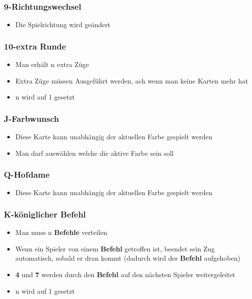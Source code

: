 \documentclass[10pt,a4paper]{article}
\providecommand{\tightlist}{%
  \setlength{\itemsep}{0pt}\setlength{\parskip}{0pt}}
\begin{document}
\subsubsection{9-Richtungswechsel}\label{richtungswechsel}

\begin{itemize}
\tightlist
\item
  Die Spielrichtung wird geändert
\end{itemize}

\subsubsection{10-extra Runde}\label{extra-runde}

\begin{itemize}
\item
  Man erhält n extra Züge
\item
  Extra Züge müssen Ausgeführt werden, ach wenn man keine Karten mehr
  hat
\item
  n wird auf 1 gesetzt
\end{itemize}

\subsubsection{J-Farbwunsch}\label{j-farbwunsch}

\begin{itemize}
\tightlist
\item
  Diese Karte kann unabhängig der aktuellen Farbe gespielt werden
\item
  Man darf auswählen welche die aktive Farbe sein soll
\end{itemize}

\subsubsection{Q-Hofdame}\label{q-hofdame}

\begin{itemize}
\tightlist
\item
  Diese Karte kann unabhängig der aktuellen Farbe gespielt werden
\end{itemize}

\subsubsection{K-königlicher Befehl}\label{k-kuxf6niglicher-befehl}

\begin{itemize}
\item
  Man muss n \textbf{Befehle} verteilen
\item
  Wenn ein Spieler von einem \textbf{Befehl} getroffen ist, beendet sein
  Zug automatisch, sobald er dran kommt (dadurch wird der
  \textbf{Befehl} aufgehoben)
\item
  \textbf{4} und \textbf{7} werden durch den \textbf{Befehl} auf den
  nächsten Spieler weitergeleitet
\item
  n wird auf 1 gesetzt
\end{itemize}
\end{document}
